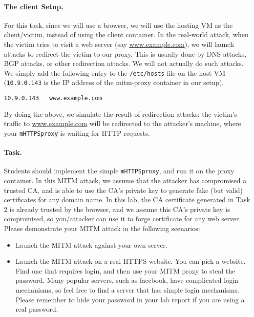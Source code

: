 \paragraph{The client Setup.} 
For this task, since we will use a browser, we will 
use the hosting VM as the client/victim, instead of using 
the client container. 
In the real-world attack, when the victim tries to visit
a web server (say \url{www.example.com}), we will launch attacks to redirect
the victim to our proxy. This is usually done by DNS attacks, BGP attacks, or other 
redirection attacks. We will not actually do such attacks. We simply 
add the following entry to the \texttt{/etc/hosts} file on the host VM (\texttt{10.9.0.143} 
is the IP address of the mitm-proxy container in our setup). 

\begin{lstlisting}
10.9.0.143   www.example.com
\end{lstlisting}

By doing the above, we simulate the result of redirection attacks:
the victim's traffic to \url{www.example.com} 
will be redirected to the attacker's machine, where your \texttt{mHTTPSproxy} 
is waiting for HTTP requests. 
 

\paragraph{Task.} Students should implement the simple \texttt{mHTTPSproxy},
and run it on the proxy container. 
In this MITM attack, we assume that the attacker has compromised a trusted CA, and is 
able to use the CA's private key to generate fake (but valid) certificates for any
domain name. In this lab, the CA certificate generated in Task 2
is already trusted by the browser, and we assume this CA's private key
is compromised, so you/attacker can use it to forge certificate for any web server. 
Please demonstrate your MITM attack in the following scenarios:


\begin{itemize}

\item Launch the MITM attack against your own server. 

\item Launch the MITM attack on a real HTTPS website. You can pick 
a website. Find one that requires login, and then use your MITM proxy to 
steal the password. Many popular servers, such as facebook, have complicated 
login mechanisms, so feel free to find a server that has simple login mechanisms. 
Please remember to hide your password in your lab report if you 
are using a real password. 
\end{itemize}



